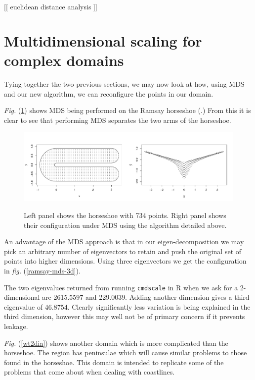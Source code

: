 \documentclass[a4paper,10pt]{amsart}
\newcommand{\fig}[1]{\emph{fig.} (\ref{#1})}
\newcommand{\Fig}[1]{\emph{Fig.} (\ref{#1})}
\begin{document}
[[ euclidean distance analysis ]]


\section{Multidimensional scaling for complex domains}

Tying together the two previous sections, we may now look at how, using MDS and our new algorithm, we can reconfigure the points in our domain.

\Fig{ramsay-mds} shows MDS being performed on the Ramsay horseshoe (\cite{ramsay}.) From this it is clear to see that performing MDS separates the two arms of the horseshoe.

\begin{figure}
\centering
\includegraphics[trim=0in 0.5in 0in 0.25in, width=5.5in]{figs/ramsay-mds.pdf} \\
\caption{Left panel shows the horseshoe with 734 points. Right panel shows their configuration under MDS using the algorithm detailed above.}
\label{ramsay-mds}
\end{figure}

An advantage of the MDS approach is that in our eigen-decomposition we may pick an arbitrary number of eigenvectors to retain and push the original set of points into higher dimensions. Using three eigenvectors we get the configuration in \fig{ramsay-mds-3d}.

The two eigenvalues returned from running \texttt{cmdscale} in \textsf{R} when we ask for a 2-dimensional are 2615.5597 and 229.0039. Adding another dimension gives a third eigenvalue of 46.8754. Clearly significantly less variation is being explained in the third dimension, however this may well not be of primary concern if it prevents leakage.


\Fig{wt2dia} shows another domain which is more complicated than the horseshoe. The region has peninsulae which will cause similar problems to those found in the horseshoe. This domain is intended to replicate some of the problems that come about when dealing with coastlines.
\end{document}
